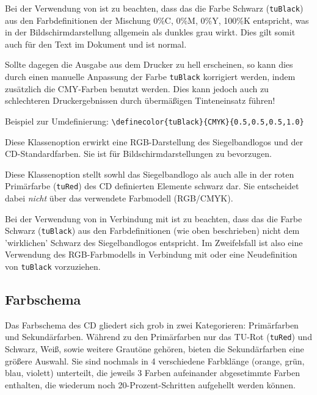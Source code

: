 \begin{important}
  Bei der Verwendung von  ist zu beachten,
  dass das die Farbe Schwarz (\texttt{tuBlack})
  aus den Farbdefinitionen der Mischung 0\%C, 0\%M, 0\%Y, 100\%K entspricht,
  was in der Bildschirmdarstellung allgemein als dunkles grau wirkt. Dies
  gilt somit auch für den Text im Dokument und ist normal.

  Sollte dagegen die Ausgabe aus dem Drucker zu hell erscheinen, so kann dies
  durch einen manuelle Anpassung der Farbe \texttt{tuBlack} korrigiert werden,
  indem zusätzlich die CMY-Farben benutzt werden. Dies kann jedoch auch zu
  schlechteren Druckergebnissen durch übermäßigen Tinteneinsatz führen!
  
  Beispiel zur Umdefinierung:
  \lstinline!\definecolor{tuBlack}{CMYK}{0.5,0.5,0.5,1.0}!
\end{important}

\begin{Declaration}
\end{Declaration}

Diese Klassenoption erwirkt eine RGB-Darstellung des Siegelbandlogos und der
CD-Standardfarben. Sie ist für Bildschirmdarstellungen zu bevorzugen.

\begin{Declaration}
\end{Declaration}

Diese Klassenoption stellt sowhl das Siegelbandlogo als auch alle in der
roten Primärfarbe (\texttt{tuRed}) des CD definierten Elemente schwarz dar.
Sie entscheidet dabei \emph{nicht} über das verwendete Farbmodell (RGB/CMYK).
\begin{important}
  Bei der Verwendung von  in Verbindung mit 
  ist zu beachten, dass das die Farbe Schwarz (\texttt{tuBlack})
  aus den Farbdefinitionen (wie oben beschrieben) nicht dem 'wirklichen' Schwarz
  des Siegelbandlogos entspricht.
  Im Zweifelsfall ist also eine Verwendung des RGB-Farbmodells in Verbindung
  mit  oder eine Neudefinition von \texttt{tuBlack} vorzuziehen.
\end{important}

\subsection{Farbschema}

Das Farbschema des CD gliedert sich grob in zwei Kategorieren: Primärfarben
und Sekundärfarben. Während zu den Primärfarben nur das TU-Rot (\texttt{tuRed})
und Schwarz, Weiß, sowie weitere Grautöne gehören, bieten die Sekundärfarben
eine größere Auswahl. Sie sind nochmals in 4 verschiedene Farbklänge
(orange, grün, blau, violett) unterteilt, die jeweils 3 Farben aufeinander
abgesetimmte Farben enthalten, die wiederum noch 20-Prozent-Schritten aufgehellt
werden können.

